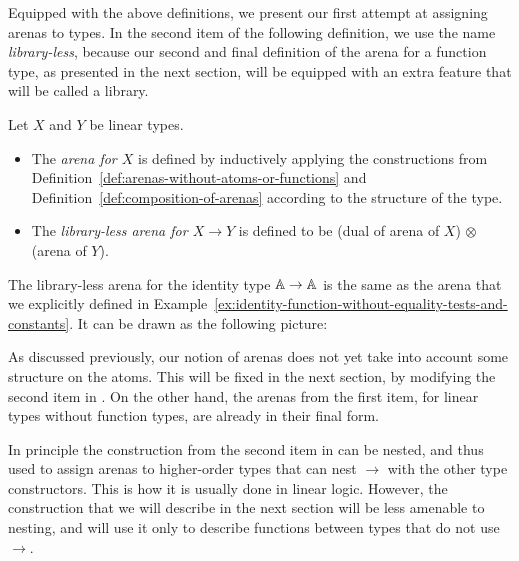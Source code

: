 \documentclass[a4paper,UKenglish,cleveref, autoref, numberwithinsect, thm-restate]{lipics-v2021}
\begin{document}
Equipped with the above definitions, we  present our first attempt at assigning arenas to types. In the second item of the following definition, we use the name \emph{library-less}, because our second and final definition of the arena for a function type, as presented in the next section, will be equipped with an extra feature that will be called a library. 


\begin{definition}\label{def:library-less} Let $X$ and $Y$ be linear types.
    \begin{itemize}
        \item The \emph{arena for  $X$} is defined by inductively applying the constructions from Definition~\ref{def:arenas-without-atoms-or-functions} and Definition~\ref{def:composition-of-arenas} according to the structure of the type.
        \item The \emph{library-less arena for $X \to Y$} is defined to be (dual of arena of $X$) $\otimes$ (arena of $Y$).
    \end{itemize}
\end{definition}
\begin{example}
    The library-less arena for the identity type $\mathbb A \to \mathbb A$ is the same as the arena that we explicitly defined in Example~\ref{ex:identity-function-without-equality-tests-and-constants}. It can be drawn as the following picture:
\end{example}

As discussed previously, our notion of arenas does not yet take into account some structure on the atoms. This will be fixed in the next section, by modifying the second item in . On the other hand, the arenas from the first item, for linear types without function types, are already in their final form. 

In principle the construction from the second item in  can be nested, and thus used to assign arenas to higher-order types that can nest $\to$ with the other type constructors. This is how it is usually done in linear logic. However,  the construction that we will describe in the next section will  be less amenable to nesting, and will use it only  to describe functions between types that do not use $\to$.


 
\end{document}
